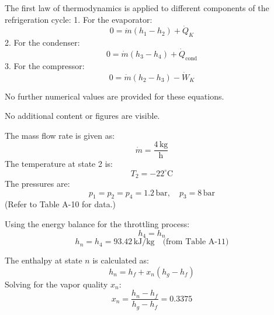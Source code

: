 The first law of thermodynamics is applied to different components of the refrigeration cycle:  
1. For the evaporator:  
\[
0 = \dot{m} \left( h_1 - h_2 \right) + \dot{Q}_K  
\]  
2. For the condenser:  
\[
0 = \dot{m} \left( h_3 - h_4 \right) + \dot{Q}_{\text{cond}}  
\]  
3. For the compressor:  
\[
0 = \dot{m} \left( h_2 - h_3 \right) - \dot{W}_K  
\]  

No further numerical values are provided for these equations.  

No additional content or figures are visible.

The mass flow rate is given as:  
\[
\dot{m} = \frac{4 \, \text{kg}}{\text{h}}
\]  
The temperature at state 2 is:  
\[
T_2 = -22^\circ \text{C}
\]  
The pressures are:  
\[
p_1 = p_2 = p_4 = 1.2 \, \text{bar}, \quad p_3 = 8 \, \text{bar}
\]  
(Refer to Table A-10 for data.)  

Using the energy balance for the throttling process:  
\[
h_4 = h_n
\]  
\[
h_n = h_4 = 93.42 \, \text{kJ/kg} \quad \text{(from Table A-11)}
\]  

The enthalpy at state \( n \) is calculated as:  
\[
h_n = h_f + x_n (h_g - h_f)
\]  
Solving for the vapor quality \( x_n \):  
\[
x_n = \frac{h_n - h_f}{h_g - h_f} = 0.3375
\]